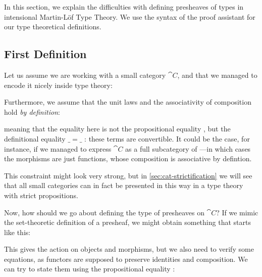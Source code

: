 In this section, we explain the difficulties with defining presheaves of types
in intensional Martin-Löf Type Theory. 
% 
We use the syntax of the \Agda proof assistant for our type theoretical 
definitions.

\subsection{First Definition}

Let us assume we are working with a small category \( \cat{C} \), and that we
managed to encode it nicely inside type theory:


Furthermore, we assume that the unit laws and the associativity of
composition hold \emph{by definition}:
% 


meaning that the equality here is not the propositional equality ,
but the definitional equality \( \_=\_\) : these terms are convertible. 
% 
It could be the case, for instance, if we managed to express \( \cat{C} \) as a 
full subcategory of ---in which cases the morphisms are just 
functions, whose composition is associative by defintion.

This constraint might look very strong, but in \cref{sec:cat-strictification}
we will see that all small categories can in fact be presented in this way
in a type theory with strict propositions.

Now, how should we go about defining the type of presheaves on \( \cat{C} \)?
If we mimic the set-theoretic definition of a presheaf, we might obtain 
something that starts like this:


This gives the action on objects and morphisms, but we also need to verify some 
equations, as functors are supposed to preserve identities and composition.
% 
We can try to state them using the propositional equality :

